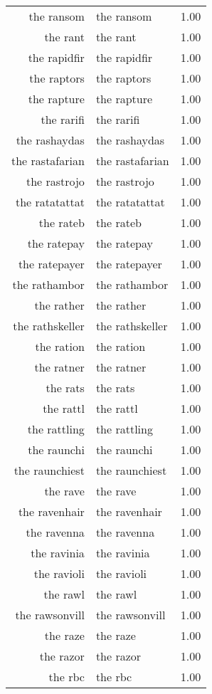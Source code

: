 \begin{table}[ht]
\begin{tabular}{rlr}
  the ransom & the ransom & 1.00 \\ 
  the rant & the rant & 1.00 \\ 
  the rapidfir & the rapidfir & 1.00 \\ 
  the raptors & the raptors & 1.00 \\ 
  the rapture & the rapture & 1.00 \\ 
  the rarifi & the rarifi & 1.00 \\ 
  the rashaydas & the rashaydas & 1.00 \\ 
  the rastafarian & the rastafarian & 1.00 \\ 
  the rastrojo & the rastrojo & 1.00 \\ 
  the ratatattat & the ratatattat & 1.00 \\ 
  the rateb & the rateb & 1.00 \\ 
  the ratepay & the ratepay & 1.00 \\ 
  the ratepayer & the ratepayer & 1.00 \\ 
  the rathambor & the rathambor & 1.00 \\ 
  the rather & the rather & 1.00 \\ 
  the rathskeller & the rathskeller & 1.00 \\ 
  the ration & the ration & 1.00 \\ 
  the ratner & the ratner & 1.00 \\ 
  the rats & the rats & 1.00 \\ 
  the rattl & the rattl & 1.00 \\ 
  the rattling & the rattling & 1.00 \\ 
  the raunchi & the raunchi & 1.00 \\ 
  the raunchiest & the raunchiest & 1.00 \\ 
  the rave & the rave & 1.00 \\ 
  the ravenhair & the ravenhair & 1.00 \\ 
  the ravenna & the ravenna & 1.00 \\ 
  the ravinia & the ravinia & 1.00 \\ 
  the ravioli & the ravioli & 1.00 \\ 
  the rawl & the rawl & 1.00 \\ 
  the rawsonvill & the rawsonvill & 1.00 \\ 
  the raze & the raze & 1.00 \\ 
  the razor & the razor & 1.00 \\ 
  the rbc & the rbc & 1.00 \\ 

\end{tabular}
\end{table}
